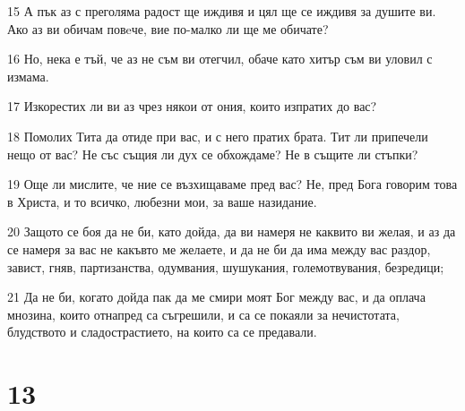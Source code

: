 \par 15 А пък аз с преголяма радост ще иждивя и цял ще се иждивя за душите ви. Ако аз ви обичам повeче, вие по-малко ли ще ме обичате?
\par 16 Но, нека е тъй, че аз не съм ви отегчил, обаче като хитър съм ви уловил с измама.
\par 17 Изкорестих ли ви аз чрез някои от ония, които изпратих до вас?
\par 18 Помолих Тита да отиде при вас, и с него пратих брата. Тит ли припечели нещо от вас? Не със същия ли дух се обхождаме? Не в същите ли стъпки?
\par 19 Още ли мислите, че ние се възхищаваме пред вас? Не, пред Бога говорим това в Христа, и то всичко, любезни мои, за ваше назидание.
\par 20 Защото се боя да не би, като дойда, да ви намеря не каквито ви желая, и аз да се намеря за вас не какъвто ме желаете, и да не би да има между вас раздор, завист, гняв, партизанства, одумвания, шушукания, големотвувания, безредици;
\par 21 Да не би, когато дойда пак да ме смири моят Бог между вас, и да оплача мнозина, които отнапред са съгрешили, и са се покаяли за нечистотата, блудството и сладострастието, на които са се предавали.

\chapter{13}

